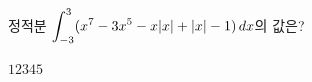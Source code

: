 정적분 $\displaystyle\int_{-3}^{3} (x^7-3x^5-x|x|+|x|-1)\mkern3mu dx$의 값은?
\begin{choices32}{$1$}{$2$}{$3$}{$4$}{$5$}\end{choices32}
